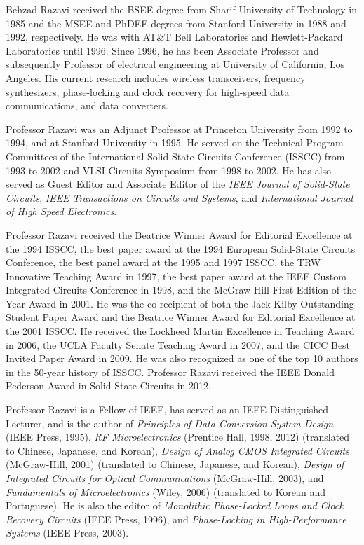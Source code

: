 \begin{IEEEbiography}{Behzad Razavi}
received the BSEE degree from Sharif University of Technology in 1985 and the MSEE and PhDEE degrees from
Stanford University in 1988 and 1992, respectively.  He was with AT\&T Bell Laboratories and Hewlett-Packard
Laboratories until 1996. Since 1996, he has been Associate Professor and subsequently Professor of electrical
engineering at University of California, Los Angeles. His current research includes wireless transceivers,
frequency synthesizers, phase-locking and clock recovery for high-speed data communications, and data
converters.

Professor Razavi was an Adjunct Professor at Princeton University from 1992 to 1994, and at Stanford University
in 1995. He served on the Technical Program Committees of the International Solid-State Circuits Conference
(ISSCC) from 1993 to 2002 and VLSI Circuits Symposium from 1998 to 2002. He has also served as Guest Editor and
Associate Editor of the {\em IEEE Journal of Solid-State Circuits}, {\em IEEE Transactions on Circuits and
Systems}, and {\em International Journal of High Speed Electronics}. 

Professor Razavi received the Beatrice Winner Award for Editorial Excellence at the 1994 ISSCC, the best paper
award at the 1994 European Solid-State Circuits Conference, the best panel award at the 1995 and 1997 ISSCC, the
TRW Innovative Teaching Award in 1997, the best paper award at the IEEE Custom Integrated Circuits Conference in
1998, and the McGraw-Hill First Edition of the Year Award in 2001. He was the co-recipient of both the Jack
Kilby Outstanding Student Paper Award and the Beatrice Winner Award for Editorial Excellence at the 2001 ISSCC.
He received the Lockheed Martin Excellence in Teaching Award in 2006, the UCLA Faculty Senate Teaching Award in
2007, and the CICC Best Invited Paper Award in 2009.  He was also recognized as one of the top 10 authors in the
50-year history of ISSCC. Professor Razavi received the IEEE Donald Pederson Award in Solid-State Circuits in
2012. 

Professor Razavi is a Fellow of IEEE, has served as an IEEE Distinguished Lecturer, and is the author of {\em
Principles of Data Conversion System Design} (IEEE Press, 1995), {\em RF Microelectronics} (Prentice Hall, 1998,
2012) (translated to Chinese, Japanese, and Korean), {\em Design of Analog CMOS Integrated Circuits}
(McGraw-Hill, 2001) (translated to Chinese, Japanese, and Korean),  {\em Design of Integrated Circuits for
Optical Communications} (McGraw-Hill, 2003), and {\em Fundamentals of Microelectronics} (Wiley, 2006)
(translated to Korean and Portuguese). He is also the editor of {\em Monolithic Phase-Locked Loops and Clock
Recovery Circuits} (IEEE Press, 1996), and {\em Phase-Locking in High-Performance Systems} (IEEE Press, 2003). 
\end{IEEEbiography}


